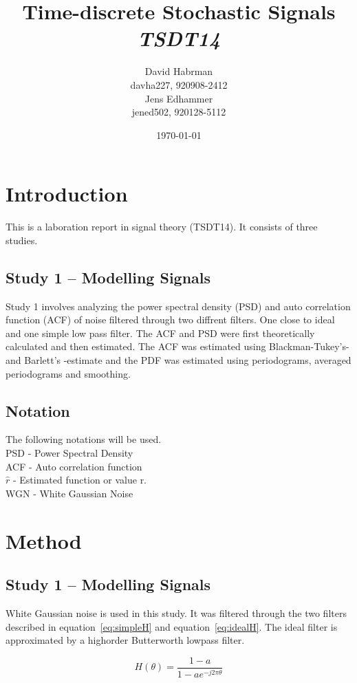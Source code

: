 \documentclass[10pt]{article}
\title{Time-discrete Stochastic Signals\\
\emph{TSDT14}}
\author{David Habrman \\ davha227, 920908-2412\\
Jens Edhammer \\ jened502, 920128-5112 }
\date{\today}
\begin{document}
\maketitle

\section{Introduction}
This is a laboration report in signal theory (TSDT14). It consists of three studies.

\subsection{Study 1 – Modelling Signals}
Study 1 involves analyzing the power spectral density (PSD) and auto correlation function (ACF)
of noise filtered through two diffrent filters. One close to ideal and one simple low pass filter.
The ACF and PSD were first theoretically calculated and then estimated.
The ACF was estimated using Blackman-Tukey's- and Barlett's -estimate and the
PDF was estimated using periodograms, averaged periodograms and smoothing.

\subsection{Notation}
The following notations will be used. \\
PSD - Power Spectral Density \\
ACF - Auto correlation function \\
$\hat{r}$ - Estimated function or value r. \\
WGN - White Gaussian Noise

\section{Method}
\subsection{Study 1 – Modelling Signals}

White Gaussian noise is used in this study. It was filtered through the two
 filters described in equation~\ref{eq:simpleH} and equation~\ref{eq:idealH}.
 The ideal filter is approximated by a highorder Butterworth lowpass filter.

\begin{equation}
  \label{eq:simpleH}
  H(\theta) =\frac{1-a}{1-ae^{-j2\pi\theta }}
\end{equation}
\end{document}
